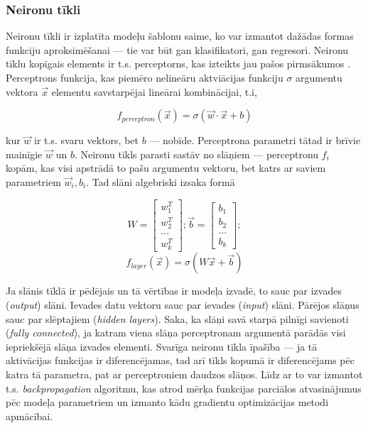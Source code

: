 \documentclass[12pt, a4paper]{article}
\numberwithin{equation}{section} %
\begin{document}
\subsubsection{Neironu tīkli}

Neironu tīkli ir izplatīta modeļu šablonu saime, ko var izmantot dažādas formas funkciju aproksimēšanai --- tie var būt gan klasifikatori, gan regresori. Neironu tīklu kopīgais elements ir t.s. perceptorns, kas izteikts jau pašos pirmsākumos \cite{mcculloch1943logical}. Perceptrons funkcija, kas piemēro nelineāru aktviācijas funkciju $\sigma$ argumentu vektora $\vec{x}$ elementu savstarpējai lineārai kombinācijai, t.i,


\begin{equation} 
    f_{perceptron}(\vec{x}) = \sigma(\vec{w} \cdot \vec{x}+b)
\end{equation}

kur $\vec{w}$ ir t.s. svaru vektors, bet $b$ ---  nobīde. Perceptrona parametri tātad ir brīvie mainīgie $\vec{w}$ un $b$. Neironu tīkls parasti sastāv no slāņiem --- perceptronu $f_i$ kopām, kas visi apstrādā to pašu argumentu vektoru, bet katrs ar saviem parametriem $\vec{w}_i,b_i$. Tad slāni algebriski izsaka formā

\begin{equation} 
    W = \begin{bmatrix}
        w_1^T \\
        w_2^T \\
        ... \\
        w_k^T
    \end{bmatrix}; 
    \vec{b} =  \begin{bmatrix}
        b_1 \\
        b_2 \\
        ... \\
        b_k
    \end{bmatrix}; 
\end{equation}
\begin{equation} 
    f_{layer}(\vec{x}) = \sigma(W\vec{x}+\vec{b})
\end{equation}

Ja slānis tīklā ir pēdējais un tā vērtības ir modeļa izvadē, to sauc par izvades (\textit{output}) slāni. Ievades datu vektoru sauc par ievades (\textit{input}) slāni. Pārējos slāņus sauc par slēptajiem (\textit{hidden layers}). Saka, ka slāņi savā starpā pilnīgi savienoti (\textit{fully connected}), ja katram viena slāņa perceptronam argumentā parādās visi iepriekšējā slāņa izvades elementi. Svarīga neironu tīkla īpašība --- ja tā aktivācijas funkcijas ir diferencējamas, tad arī tīkls kopumā ir diferencējams pēc katra tā parametra, pat ar perceptroniem daudzos slāņos. Līdz ar to var izmantot t.s. \textit{backpropagation} algoritmu, kas atrod mērķa funkcijas parciālos atvasinājumus pēc modeļa parametriem un izmanto kādu gradientu optimizācijas metodi apmācībai.
\end{document}

